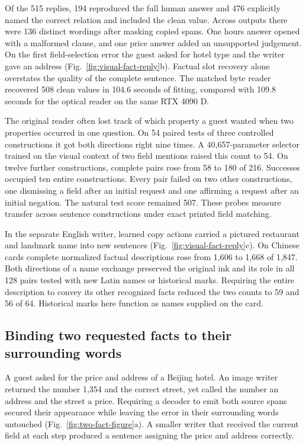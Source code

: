 \documentclass[12pt,a4paper]{article}
\providecommand{\DIFadd}[1]{{\protect\color{blue} \sf #1}} %
\begin{document}
\DIFadd{Of the 515 replies, 194 reproduced the full human answer and 476 explicitly named the correct relation and included the clean value. Across outputs there were 136 distinct wordings after masking copied spans. One hours answer opened with a malformed clause, and one price answer added an unsupported judgement. On the first field-selection error the guest asked for hotel type and the writer gave an address (Fig.~\ref{fig:visual-fact-reply}b). Factual slot recovery alone overstates the quality of the complete sentence. The matched byte reader recovered 508 clean values in 104.6 seconds of fitting, compared with 109.8 seconds for the optical reader on the same RTX 4090 D.
}

\DIFadd{The original reader often lost track of which property a guest wanted when two properties occurred in one question. On 54 paired tests of three controlled constructions it got both directions right nine times. A 40,657-parameter selector trained on the visual context of two field mentions raised this count to 54. On twelve further constructions, complete pairs rose from 58 to 180 of 216. Successes occupied ten entire constructions. Every pair failed on two other constructions, one dismissing a field after an initial request and one affirming a request after an initial negation. The natural test score remained 507. These probes measure transfer across sentence constructions under exact printed field matching.
}

\DIFadd{In the separate English writer, learned copy actions carried a pictured restaurant and landmark name into new sentences (Fig.~\ref{fig:visual-fact-reply}c). On Chinese cards complete normalized factual descriptions rose from 1,606 to 1,668 of 1,847. Both directions of a name exchange preserved the original ink and its role in all 128 pairs tested with new Latin names or historical marks. Requiring the entire description to convey its other recognized facts reduced the two counts to 59 and 56 of 64. Historical marks here function as names supplied on the card.
}

\subsection*{\DIFadd{Binding two requested facts to their surrounding words}}
\DIFadd{A guest asked for the price and address of a Beijing hotel. An image writer returned the number 1,354 and the correct street, yet called the number an address and the street a price. Requiring a decoder to emit both source spans secured their appearance while leaving the error in their surrounding words untouched (Fig.~\ref{fig:two-fact-figure}a). A smaller writer that received the current field at each step produced a sentence assigning the price and address correctly.
}
\end{document}
